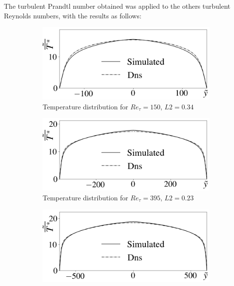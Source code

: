 \documentclass[10pt]{article} %
\begin{document}
The turbulent Prandtl number obtained was applied to the others turbulent Reynolds numbers, with the results as follows:
\begin{figure}[!h]
	\centering
	\begin{subfigure}[t]{0.5\textwidth}
		\centering
		\includegraphics[angle=0, scale=0.3]{fotos_formatacao_final/Temperature_150_071_Prt0905_A26}
		\caption{Temperature distribution for $Re_\tau = 150$, $L2 = 0.34$}
	\end{subfigure}
	\begin{subfigure}[t]{0.45\textwidth}
		\centering
		\includegraphics[angle=0, scale=0.3]{fotos_formatacao_final/Temperature_395_071_Prt0905_A26}
		\caption{Temperature distribution for $Re_\tau = 395$, $L2 = 0.23$}
	\end{subfigure}
	\begin{subfigure}[t]{0.5\textwidth}
		\centering
		\includegraphics[angle=0, scale=0.3]{fotos_formatacao_final/Temperature_640_071_Prt0905_A26}

\end{subfigure}
\end{figure}
\end{document}
